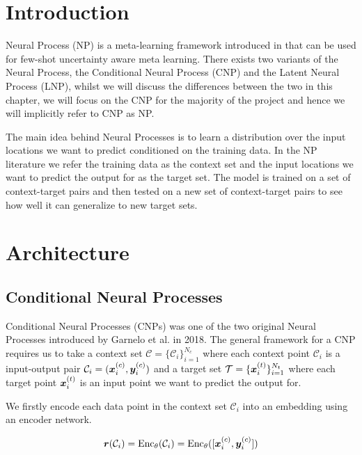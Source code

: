 \documentclass[../../main.tex]{subfiles}
\begin{document}
\section{Introduction}

Neural Process (NP) is a meta-learning framework introduced in \parencite{garnelo2018conditional, garnelo2018neural} that can be used for few-shot uncertainty aware meta learning. There exists two variants of the Neural Process, the Conditional Neural Process (CNP) and the Latent Neural Process (LNP), whilst we will discuss the differences between the two in this chapter, we will focus on the CNP for the majority of the project and hence we will implicitly refer to CNP as NP. 

The main idea behind Neural Processes is to learn a distribution over the input locations we want to predict conditioned on the training data. In the NP literature we refer the training data as the context set and the input locations we want to predict the output for as the target set. The model is trained on a set of context-target pairs and then tested on a new set of context-target pairs to see how well it can generalize to new target sets.

\section{Architecture}

\subsection{Conditional Neural Processes}

Conditional Neural Processes (CNPs) \parencite{garnelo2018conditional} was one of the two original Neural Processes introduced by Garnelo et al. in 2018. The general framework for a CNP requires us to take a context set $\mathcal{C} = \{ \mathcal{C}_i \}_{i=1}^{N_c}$ where each context point $\mathcal{C}_i$ is a input-output pair $\mathcal{C}_i = (\bm{x}_{i}^{(c)}, \bm{y}_i^{(c)}) $ and a target set $\mathcal{T} = \{ \bm{x}_{i}^{(t)} \}_{i=1}^{N_t}$ where each target point $\bm{x}_{i}^{(t)}$ is an input point we want to predict the output for.

We firstly encode each data point in the context set $\mathcal{C}_i$ into an embedding using an encoder network.


\begin{equation}
    \bm{r}(\mathcal{C}_i) = \text{Enc}_\theta(\mathcal{C}_i) = \text{Enc}_\theta( [\bm{x}_{i}^{(c)}, \bm{y}_i^{(c)}] )
\end{equation}
\end{document}

